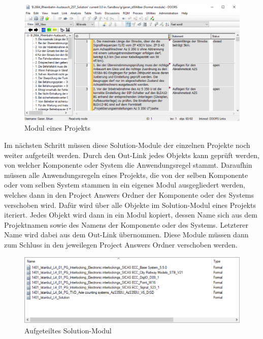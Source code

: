 \begin{figure}[H]
    \centering
    \includegraphics[width = \textwidth]{abbildungen/Solutions.PNG}
    \caption{Modul eines Projekts}
    \label{fig:SolutionsModul}
\end{figure}

Im nächsten Schritt müssen diese Solution-Module der einzelnen Projekte noch weiter aufgeteilt werden. Durch den Out-Link jedes Objekts kann geprüft werden, von welcher Komponente oder System die
Anwendungsregel stammt. Daraufhin müssen alle Anwendungsregeln eines Projekts, die von der selben Komponente oder vom selben System stammen in ein eigenes Modul ausgegliedert werden, welches dann
in den Project Answers Ordner der Komponente oder des Systems verschoben wird. Dafür wird über alle Objekte im Solution-Modul eines Projekts iteriert. Jedes Objekt wird dann 
in ein Modul kopiert, dessen Name sich aus dem Projektnamen sowie des Namens der Komponente oder des Systems. Letzterer Name wird dabei aus dem Out-Link übernommen. Diese Module müssen dann 
zum Schluss in den jeweilegen Project Answers Ordner verschoben werden.

\begin{figure}[H]
    \centering
    \includegraphics[width = \textwidth]{abbildungen/Aufgeteilte Module.PNG}
    \caption{Aufgeteiltes Solution-Modul}
    \label{fig:AufgeteilteModule}
\end{figure}

